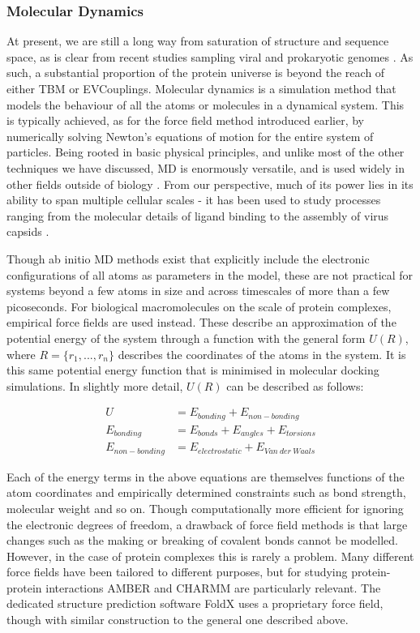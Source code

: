 \documentclass[a4paper,11pt,twoside,openright]{scrbook}
\begin{document}
\subsubsection{Molecular Dynamics}
At present, we are still a long way from saturation of structure and sequence
space, as is clear from recent studies sampling viral and prokaryotic genomes
\cite{Brum2016,Shi2016,Mukherjee2017}. As such, a substantial proportion of the
protein universe is beyond the reach of either TBM or EVCouplings. Molecular
dynamics is a simulation method that models the behaviour of all the atoms or
molecules in a dynamical system. This is typically achieved, as for the force
field method introduced earlier, by numerically solving Newton's equations of
motion for the entire system of particles. Being rooted in basic physical
principles, and unlike most of the other techniques we have discussed, MD is
enormously versatile, and is used widely in other fields outside of biology
\cite{Hu2013,Rapaport2014,Shao2015}. From our perspective, much of its power
lies in its ability to span multiple cellular scales - it has been used to study
processes ranging from the molecular details of ligand binding to the assembly
of virus capsids \cite{Buch2011,Zhao2013}.

Though ab initio MD methods exist that explicitly include the electronic
configurations of all atoms as parameters in the model, these are not practical
for systems beyond a few atoms in size and across timescales of more than a few
picoseconds. For biological macromolecules on the scale of protein complexes,
empirical force fields are used instead. These describe an approximation of the
potential energy of the system through a function with the general form $ U(R)
$, where $ R = \{r_{1}, ..., r_{n}\} $ describes the coordinates of the atoms in
the system. It is this same potential energy function that is minimised in
molecular docking simulations. In slightly more detail, $ U(R) $ can be
described as follows:

\begin{align*}
    U &= E_{bonding} + E_{non-bonding}\\
    E_{bonding} &= E_{bonds} + E_{angles} + E_{torsions}\\
    E_{non-bonding} &= E_{electrostatic} + E_{Van\ der\ Waals}
\end{align*}

Each of the energy terms in the above equations are themselves functions of the
atom coordinates and empirically determined constraints such as bond strength,
molecular weight and so on. Though computationally more efficient for ignoring
the electronic degrees of freedom, a drawback of force field methods is that
large changes such as the making or breaking of covalent bonds cannot be
modelled. However, in the case of protein complexes this is rarely a problem.
Many different force fields have been tailored to different purposes, but for
studying protein-protein interactions AMBER \cite{Salomon-Ferrer2013,Amber2017}
and CHARMM \cite{Brooks2009} are particularly relevant. The dedicated structure
prediction software FoldX \cite{Schymkowitz2005} uses a proprietary force field,
though with similar construction to the general one described above.
\end{document}
